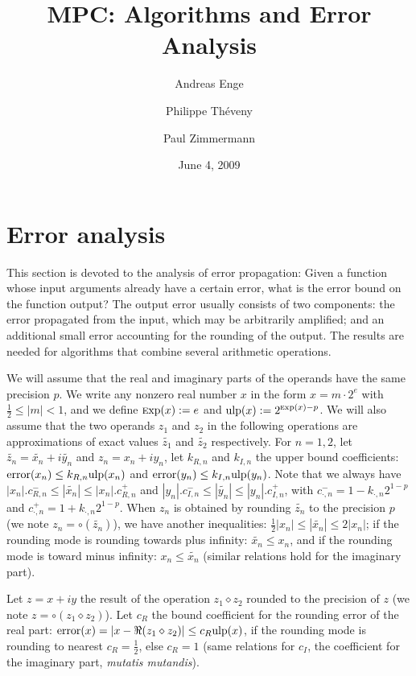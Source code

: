 \documentclass {article}
\title {MPC: Algorithms and Error Analysis}
\author {Andreas Enge \and Philippe Th\'eveny \and Paul Zimmermann}
\date {June 4, 2009}
\newcommand {\Ulp}{{\rm ulp}}
\DeclareMathOperator{\error}{error}
\DeclareMathOperator{\Exp}{{\rm \textsc exp}}
\begin{document}
\maketitle
\tableofcontents


\section {Error analysis}

This section is devoted to the analysis of error propagation: Given a function
whose input arguments already have a certain error, what is the error bound on
the function output? The output error usually consists of two components: the
error propagated from the input, which may be arbitrarily amplified; and an
additional small error accounting for the rounding of the output. The results
are needed for algorithms that combine several arithmetic operations.

We will assume that the real and imaginary parts of the operands have the same
precision $p$. We write any nonzero real number $x$ in the form $x = m \cdot
2^e$ with $\frac{1}{2} \le |m| < 1$, and we define $\Exp(x) := e$ and $\Ulp(x)
:= 2^{\Exp(x) - p}$.  We will also assume that the two operands $z_1$ and
$z_2$ in the following operations are approximations of exact values
$\widetilde{z_1}$ and $\widetilde{z_2}$ respectively. For $n=1, 2$, let
$\widetilde{z_n} = \widetilde{x_n} + i \widetilde{y_n}$ and $z_n = x_n + i
y_n$, let $k_{R,n}$ and $k_{I,n}$ the upper bound coefficients: $\error(x_n)
\leq k_{R,n} \Ulp(x_n)$ and $\error(y_n) \leq k_{I,n} \Ulp(y_n)$.  Note that
we always have $|x_n|.c_{R,n}^- \leq |\widetilde{x_n}| \leq |x_n|.c_{R,n}^+$
and $|y_n|.c_{I,n}^- \leq |\widetilde{y_n}| \leq |y_n|.c_{I,n}^+$, with
$c_{\cdot,n}^- = 1-k_{\cdot,n}2^{1-p}$ and $c_{\cdot,n}^+ =
1+k_{\cdot,n}2^{1-p}$. When $z_n$ is obtained by rounding $\widetilde{z_n}$ to
the precision $p$ (we note $z_n=\circ(\widetilde{z_n})$), we have another
inequalities: $\frac{1}{2}|x_n| \leq |\widetilde{x_n}| \leq 2|x_n|$; if the
rounding mode is rounding towards plus infinity: $\widetilde{x_n} \leq x_n$,
and if the rounding mode is toward minus infinity: $x_n \leq \widetilde{x_n}$
(similar relations hold for the imaginary part).

Let $z=x+iy$ the result of the operation $z_1\diamond z_2$ rounded to the
precision of $z$ (we note $z=\circ(z_1 \diamond z_2)$). Let $c_R$ the bound
coefficient for the rounding error of the real part: $\error(x) = |x-\Re(z_1
\diamond z_2)| \leq c_R \Ulp(x)$, if the rounding mode is rounding to nearest
$c_R=\frac{1}{2}$, else $c_R=1$ (same relations for $c_I$, the coefficient for
the imaginary part, \emph{mutatis mutandis}).
\end{document}
